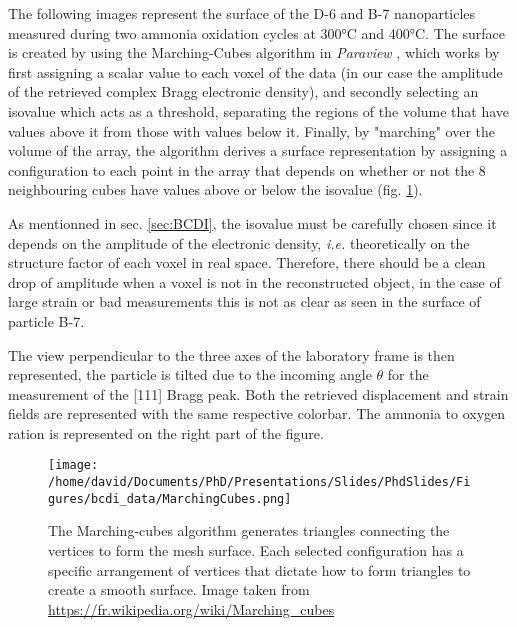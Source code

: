 The following images represent the surface of the D-6 and B-7 nanoparticles measured during two ammonia oxidation cycles at 300°C and 400°C.
The surface is created by using the Marching-Cubes algorithm \parencite{Lorensen1987} in \textit{Paraview} \parencite{Ahrens2001}, which works by first assigning a scalar value to each voxel of the data (in our case the amplitude of the retrieved complex Bragg electronic density), and secondly selecting an isovalue which acts as a threshold, separating the regions of the volume that have values above it from those with values below it.
Finally, by "marching" over the volume of the array, the algorithm derives a surface representation by assigning a configuration to each point in the array that depends on whether or not the 8 neighbouring cubes have values above or below the isovalue (fig. \ref{fig:MarchingCubes}).

As mentionned in sec. \ref{sec:BCDI}, the isovalue must be carefully chosen since it depends on the amplitude of the electronic density, \textit{i.e.} theoretically on the structure factor of each voxel in real space.
Therefore, there should be a clean drop of amplitude when a voxel is not in the reconstructed object, in the case of large strain or bad measurements this is not as clear as seen in the surface of particle B-7.

The view perpendicular to the three axes of the laboratory frame is then represented, the particle is tilted due to the incoming angle $\theta$ for the measurement of the [111] Bragg peak.
Both the retrieved displacement and strain fields are represented with the same respective colorbar.
The ammonia to oxygen ration is represented on the right part of the figure.

\begin{figure}[!htb]
    \centering
    \texttt{[image: /home/david/Documents/PhD/Presentations/Slides/PhdSlides/Figures/bcdi\_data/MarchingCubes.png]}
    \caption{
    The Marching-cubes algorithm generates triangles connecting the vertices to form the mesh surface.
    Each selected configuration has a specific arrangement of vertices that dictate how to form triangles to create a smooth surface.
    Image taken from \url{https://fr.wikipedia.org/wiki/Marching_cubes}
    }
    \label{fig:MarchingCubes}
\end{figure}


